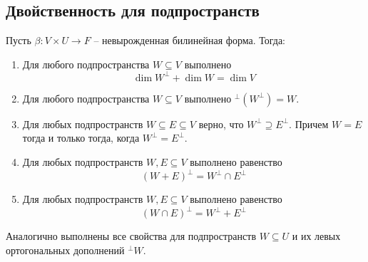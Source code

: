 \subsection{Двойственность для подпространств}

\begin{claim}
\label{claim::DualitySpaces}
Пусть $\beta\colon V\times U\to F$ -- невырожденная билинейная форма.
Тогда:
\begin{enumerate}
\item Для любого подпространства $W\subseteq V$ выполнено
\[
\dim W^\bot + \dim W = \dim V
\]

\item Для любого подпространства $W\subseteq V$ выполнено ${}^\bot(W^\bot) = W$.

\item Для любых подпространств $W\subseteq E\subseteq V$ верно, что $W^\bot \supseteq E^\bot$.
Причем $W = E$ тогда и только тогда, когда $W^\bot = E^\bot$.

\item Для любых подпространств $W, E\subseteq V$ выполнено равенство
\[
(W + E)^\bot = W^\bot \cap E^\bot
\]

\item Для любых подпространств $W, E\subseteq V$ выполнено равенство
\[
(W\cap E)^\bot = W^\bot + E^\bot
\]
\end{enumerate}
Аналогично выполнены все свойства для подпространств $W\subseteq U$ и их левых ортогональных дополнений ${}^\bot W$.
\end{claim}
